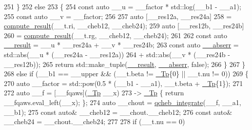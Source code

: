 \begin{DoxyCode}
251             \}
252           \textcolor{keywordflow}{else}
253             \{
254               \textcolor{keyword}{const} \textcolor{keyword}{auto} \_\_u = \_\_factor * std::log(\_\_b1 - \_\_a1);
255               \textcolor{keyword}{const} \textcolor{keyword}{auto} \_\_v = \_\_factor;
256 
257               \textcolor{keyword}{auto} [\_\_res12a, \_\_res24a]
258                 = \hyperlink{namespace____gnu__cxx_a10e06852570922cdc1aca86883b5161e}{compute\_result}(\_\_t.ri, \_\_cheb12, \_\_cheb24);
259               \textcolor{keyword}{auto} [\_\_res12b, \_\_res24b]
260                 = \hyperlink{namespace____gnu__cxx_a10e06852570922cdc1aca86883b5161e}{compute\_result}(\_\_t.rg, \_\_cheb12, \_\_cheb24);
261 
262               \textcolor{keyword}{const} \textcolor{keyword}{auto} \hyperlink{namespace____gnu__cxx_a500ea9f53aeaecd8c2ae657503450578}{\_\_result} = \_\_u * \_\_res24a + \_\_v * \_\_res24b;
263               \textcolor{keyword}{const} \textcolor{keyword}{auto} \hyperlink{namespace____gnu__cxx_a72f736cff127f1574e91a301de9e074b}{\_\_abserr} = std::abs(\_\_u * (\_\_res24a - \_\_res12a))
264                                   + std::abs(\_\_v * (\_\_res24b - \_\_res12b));
265               \textcolor{keywordflow}{return} std::make\_tuple(\hyperlink{namespace____gnu__cxx_a500ea9f53aeaecd8c2ae657503450578}{\_\_result}, \hyperlink{namespace____gnu__cxx_a72f736cff127f1574e91a301de9e074b}{\_\_abserr}, \textcolor{keyword}{false});
266             \}
267         \}
268       \textcolor{keywordflow}{else} \textcolor{keywordflow}{if} (\_\_b1 == \_\_upper && (\_\_t.beta != \hyperlink{namespace____gnu__cxx_a3b19a9c800ca194374ef9172290f7d79}{\_Tp}\{0\} || \_\_t.nu != 0))
269         \{
270           \textcolor{keyword}{auto} \_\_factor = std::pow(0.5 * (\_\_b1 - \_\_a1), \_\_t.beta + \hyperlink{namespace____gnu__cxx_a3b19a9c800ca194374ef9172290f7d79}{\_Tp}\{1\});
271 
272           \textcolor{keyword}{auto} \_\_f = [\_\_fqaws](\hyperlink{namespace____gnu__cxx_a3b19a9c800ca194374ef9172290f7d79}{\_Tp} \_\_x)
273                      -> \hyperlink{namespace____gnu__cxx_a3b19a9c800ca194374ef9172290f7d79}{\_Tp} \{ \textcolor{keywordflow}{return} \_\_fqaws.eval\_left(\_\_x); \};
274           \textcolor{keyword}{auto} \_\_chout = \hyperlink{namespace____gnu__cxx_aa8e32fefb92558e0c8ddb94c25fd637b}{qcheb\_integrate}(\_\_f, \_\_a1, \_\_b1);
275           \textcolor{keyword}{const} \textcolor{keyword}{auto}& \_\_cheb12 = \_\_chout.\_\_cheb12;
276           \textcolor{keyword}{const} \textcolor{keyword}{auto}& \_\_cheb24 = \_\_chout.\_\_cheb24;
277 
278           \textcolor{keywordflow}{if} (\_\_t.nu == 0)

\end{DoxyCode}

